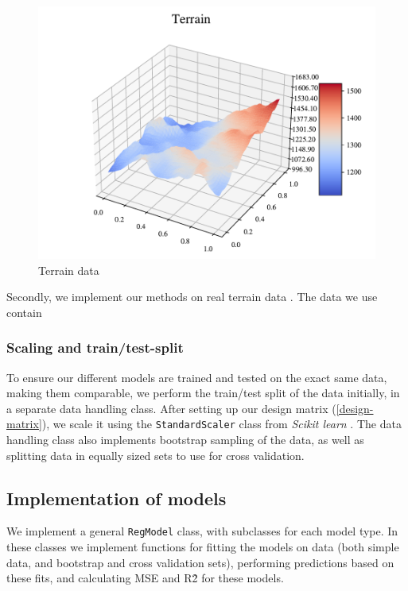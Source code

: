 \begin{figure}
    \centering
    \includegraphics[width=1\linewidth]{project_1/figures/figures_in_report/terrain.pdf}
    \caption{Terrain data}
    \label{data:terrain}
\end{figure}

Secondly, we implement our methods on real terrain data \cite{mortengithub}. The data we use contain 


\subsubsection{Scaling and train/test-split}
To ensure our different models are trained and tested on the exact same data, making them comparable, we perform the train/test split of the data initially, in a separate data handling class.
After setting up our design matrix (\ref{design-matrix}), we scale it using the \texttt{StandardScaler} class from \textit{Scikit learn} \cite{sklearn}.
The data handling class also implements bootstrap sampling of the data, as well as splitting data in equally sized sets to use for cross validation.

\subsection{Implementation of models}
We implement a general \texttt{RegModel} class, with subclasses for each model type.
In these classes we implement functions for fitting the models on data (both simple data, and bootstrap and cross validation sets), performing predictions based on these fits, and calculating MSE and R\^2 for these models.

